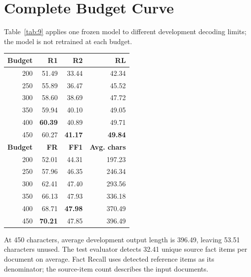 \documentclass[10pt,twocolumn,letterpaper]{article}
\begin{document}
\par\medskip\noindent\begin{minipage}{\columnwidth}
\section{Complete Budget Curve}\label{appendix-e-complete-budget-curve}

Table~\ref{tab:9} applies one frozen model to different development decoding limits; the model is not retrained at each budget.

\label{tab:9}
\begin{tabular*}{\columnwidth}{@{\extracolsep{\fill}}rrrr@{}}
\toprule
\textbf{Budget} & \textbf{R1} & \textbf{R2} & \textbf{RL} \\
\midrule
200 & 51.49 & 33.44 & 42.34 \\
250 & 55.89 & 36.47 & 45.52 \\
300 & 58.60 & 38.69 & 47.72 \\
350 & 59.94 & 40.10 & 49.05 \\
400 & \textbf{60.39} & 40.89 & 49.71 \\
450 & 60.27 & \textbf{41.17} & \textbf{49.84} \\
\midrule
\textbf{Budget} & \textbf{FR} & \textbf{FF1} & \textbf{Avg. chars} \\
\midrule
200 & 52.01 & 44.31 & 197.23 \\
250 & 57.96 & 46.35 & 246.34 \\
300 & 62.41 & 47.40 & 293.56 \\
350 & 66.13 & 47.93 & 336.18 \\
400 & 68.71 & \textbf{47.98} & 370.49 \\
450 & \textbf{70.21} & 47.85 & 396.49 \\
\bottomrule
\end{tabular*}
\end{minipage}\par\smallskip

At 450 characters, average development output length is 396.49, leaving 53.51 characters unused. The test evaluator detects 32.41 unique source fact items per document on average. Fact Recall uses detected reference items as its denominator; the source-item count describes the input documents.
\end{document}
